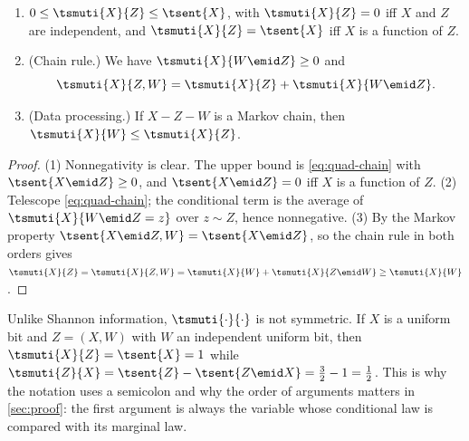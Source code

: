 \begin{lemma}
\label{lem:quad-properties}
\leavevmode
\begin{enumerate}
\item $0\le\tsmuti{X}{Z}\le\tsent{X}$, with
  $\tsmuti{X}{Z}=0$ iff $X$ and $Z$ are independent, and
  $\tsmuti{X}{Z}=\tsent{X}$ iff $X$ is a function of $Z$.
\item (Chain rule.) We have $\tsmuti{X}{W\emid Z}\ge0$ and
\begin{equation*}
  \tsmuti{X}{Z,W}=\tsmuti{X}{Z}+\tsmuti{X}{W\emid Z}.
\end{equation*}
\item (Data processing.) If $X-Z-W$ is a Markov chain, then
  $\tsmuti{X}{W}\le\tsmuti{X}{Z}$.
\end{enumerate}
\end{lemma}
\begin{proof}
(1) Nonnegativity is clear. The upper bound is
\eqref{eq:quad-chain} with $\tsent{X\emid Z}\ge0$, and
$\tsent{X\emid Z}=0$ iff $X$ is a function of $Z$.
(2) Telescope \eqref{eq:quad-chain}; the conditional term is the
average of $\tsmuti{X}{W\emid Z=z}$ over $z\sim Z$, hence
nonnegative.
(3) By the Markov property $\tsent{X\emid Z,W}=\tsent{X\emid Z}$,
so the chain rule in both orders gives
$\tsmuti{X}{Z}=\tsmuti{X}{Z,W}=\tsmuti{X}{W}+\tsmuti{X}{Z\emid W}
\ge\tsmuti{X}{W}$.
\end{proof}

Unlike Shannon information, $\tsmuti{\cdot}{\cdot}$ is not
symmetric. If $X$ is a uniform bit and $Z=(X,W)$ with $W$ an
independent uniform bit, then $\tsmuti{X}{Z}=\tsent{X}=1$ while
$\tsmuti{Z}{X}=\tsent{Z}-\tsent{Z\emid X}=\tfrac32-1=\tfrac12$.
This is why the notation uses a semicolon and why the order of
arguments matters in \autoref{sec:proof}: the first argument is
always the variable whose conditional law is compared with its marginal law.

\fi

